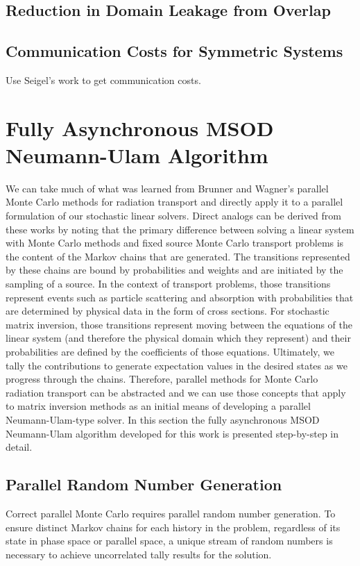 \subsection{Reduction in Domain Leakage from Overlap}
\label{sec:overlap_reduction}

\subsection{Communication Costs for Symmetric Systems}
\label{sec:symmetric_comm_costs}
Use Seigel's work to get communication costs.

\section{Fully Asynchronous MSOD Neumann-Ulam Algorithm}
\label{sec:asynchronous_algorithm}
We can take much of what was learned from Brunner and Wagner's
parallel Monte Carlo methods for radiation transport and directly
apply it to a parallel formulation of our stochastic linear
solvers. Direct analogs can be derived from these works by noting that
the primary difference between solving a linear system with Monte
Carlo methods and fixed source Monte Carlo transport problems is the
content of the Markov chains that are generated. The transitions
represented by these chains are bound by probabilities and weights and
are initiated by the sampling of a source. In the context of transport
problems, those transitions represent events such as particle
scattering and absorption with probabilities that are determined by
physical data in the form of cross sections. For stochastic matrix
inversion, those transitions represent moving between the equations of
the linear system (and therefore the physical domain which they
represent) and their probabilities are defined by the coefficients of
those equations. Ultimately, we tally the contributions to generate
expectation values in the desired states as we progress through the
chains. Therefore, parallel methods for Monte Carlo radiation
transport can be abstracted and we can use those concepts that apply
to matrix inversion methods as an initial means of developing a
parallel Neumann-Ulam-type solver. In this section the fully
asynchronous MSOD Neumann-Ulam algorithm developed for this work is
presented step-by-step in detail.

\subsection{Parallel Random Number Generation}
\label{subsec:parallel_rng}
Correct parallel Monte Carlo requires parallel random number
generation. To ensure distinct Markov chains for each history in the
problem, regardless of its state in phase space or parallel space, a
unique stream of random numbers is necessary to achieve uncorrelated
tally results for the solution. 

